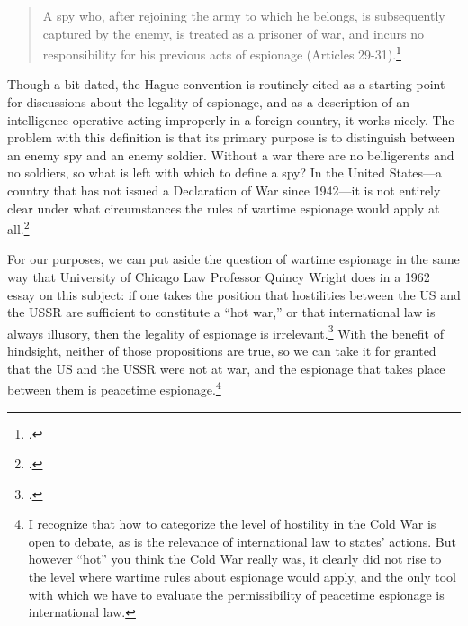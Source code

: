 \documentclass{memoir}
\begin{document}
\begin{refsegment}
\begin{quote}
A spy who, after rejoining the army to which he belongs, is subsequently captured by the enemy, is treated as a prisoner of war, and incurs no responsibility for his previous acts of espionage (Articles 29-31).\footcite{noauthor_hague_1907} \\
\end{quote}
Though a bit dated, the Hague convention is routinely cited as a starting point for discussions about the legality of espionage, and as a description of an intelligence operative acting improperly in a foreign country, it works nicely. The problem with this definition is that its primary purpose is to distinguish between an enemy spy and an enemy soldier. Without a war there are no belligerents and no soldiers, so what is left with which to define a spy? In the United States---a country that has not issued a Declaration of War since 1942---it is not entirely clear under what circumstances the rules of wartime espionage would apply at all.\footcite{ncc_staff_when_2018}


For our purposes, we can put aside the question of wartime espionage in the same way that University of Chicago Law Professor Quincy Wright does in a 1962 essay on this subject: if one takes the position that hostilities between the US and the USSR are sufficient to constitute a ``hot war,'' or that international law is always illusory, then the legality of espionage is irrelevant.\footcite[p.~8]{wright_espionage_1962} With the benefit of hindsight, neither of those propositions are true, so we can take it for granted that the US and the USSR were not at war, and the espionage that takes place between them is peacetime espionage.\footnote{I recognize that how to categorize the level of hostility in the Cold War is open to debate, as is the relevance of international law to states' actions. But however ``hot'' you think the Cold War really was, it clearly did not rise to the level where wartime rules about espionage would apply, and the only tool with which we have to evaluate the permissibility of peacetime espionage is international law.}


\end{refsegment}
\end{document}
